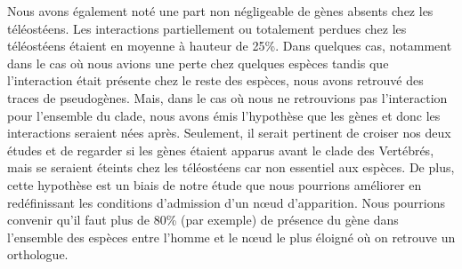 \par Nous avons également noté une part non négligeable de gènes absents chez les téléostéens. Les interactions partiellement ou totalement perdues chez les téléostéens étaient en moyenne à hauteur de 25\%. Dans quelques cas, notamment dans le cas où nous avions une perte chez quelques espèces tandis que l’interaction était présente chez le reste des espèces, nous avons retrouvé des traces de pseudogènes. Mais, dans le cas où nous ne retrouvions pas l’interaction pour l’ensemble du clade, nous avons émis l’hypothèse que les gènes et donc les interactions seraient nées après. Seulement, il serait pertinent de croiser nos deux études et de regarder si les gènes étaient apparus avant le clade des Vertébrés, mais se seraient éteints chez les téléostéens car non essentiel aux espèces. De plus, cette hypothèse est un biais de notre étude que nous pourrions améliorer en redéfinissant les conditions d’admission d’un nœud d’apparition. Nous pourrions convenir qu’il faut plus de 80\% (par exemple) de présence du gène dans l’ensemble des espèces entre l’homme et le nœud le plus éloigné où on retrouve un orthologue.  


\newpage
